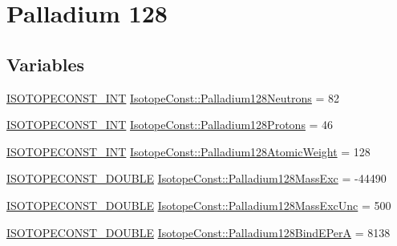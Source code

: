\hypertarget{group___isotope_const-_palladium-_pd128}{}\section{Palladium 128}
\label{group___isotope_const-_palladium-_pd128}
\subsection*{Variables}
\begin{DoxyCompactItemize}
\item 
\mbox{\hyperlink{group___isotope_const-_macros_ga5f18360b3e99483a35c32d789e62621c}{I\+S\+O\+T\+O\+P\+E\+C\+O\+N\+S\+T\+\_\+\+I\+NT}} \mbox{\hyperlink{group___isotope_const-_palladium-_pd128_gad8792c946bdc3ebdbd958a25324c1986}{Isotope\+Const\+::\+Palladium128\+Neutrons}} = 82
\item 
\mbox{\hyperlink{group___isotope_const-_macros_ga5f18360b3e99483a35c32d789e62621c}{I\+S\+O\+T\+O\+P\+E\+C\+O\+N\+S\+T\+\_\+\+I\+NT}} \mbox{\hyperlink{group___isotope_const-_palladium-_pd128_ga0198876df0e435450a848d64a687ba74}{Isotope\+Const\+::\+Palladium128\+Protons}} = 46
\item 
\mbox{\hyperlink{group___isotope_const-_macros_ga5f18360b3e99483a35c32d789e62621c}{I\+S\+O\+T\+O\+P\+E\+C\+O\+N\+S\+T\+\_\+\+I\+NT}} \mbox{\hyperlink{group___isotope_const-_palladium-_pd128_gac3ea36ba002d4bf9f1a0909575cd550a}{Isotope\+Const\+::\+Palladium128\+Atomic\+Weight}} = 128
\item 
\mbox{\hyperlink{group___isotope_const-_macros_ga8f45a7272ce02c0b4c65c44636ed719a}{I\+S\+O\+T\+O\+P\+E\+C\+O\+N\+S\+T\+\_\+\+D\+O\+U\+B\+LE}} \mbox{\hyperlink{group___isotope_const-_palladium-_pd128_ga7eeb05ef5032eeea2fb333b362edf041}{Isotope\+Const\+::\+Palladium128\+Mass\+Exc}} = -\/44490
\item 
\mbox{\hyperlink{group___isotope_const-_macros_ga8f45a7272ce02c0b4c65c44636ed719a}{I\+S\+O\+T\+O\+P\+E\+C\+O\+N\+S\+T\+\_\+\+D\+O\+U\+B\+LE}} \mbox{\hyperlink{group___isotope_const-_palladium-_pd128_gaebb158f7ff26c937cf169be3fd5afb4e}{Isotope\+Const\+::\+Palladium128\+Mass\+Exc\+Unc}} = 500
\item 
\mbox{\hyperlink{group___isotope_const-_macros_ga8f45a7272ce02c0b4c65c44636ed719a}{I\+S\+O\+T\+O\+P\+E\+C\+O\+N\+S\+T\+\_\+\+D\+O\+U\+B\+LE}} \mbox{\hyperlink{group___isotope_const-_palladium-_pd128_gaa66a9ac03edd99e9ba76a5877c4bf269}{Isotope\+Const\+::\+Palladium128\+Bind\+E\+PerA}} = 8138
\item 

\end{DoxyCompactItemize}
